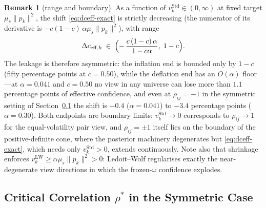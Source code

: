 \documentclass[a4paper,11pt]{article}
\theoremstyle{plain}
\theoremstyle{definition}
\newtheorem{remark}[proposition]{Remark}
\newcommand{\Std}{\mathrm{Std}}
\newcommand{\LW}{\mathrm{LW}}
\newcommand{\eff}{\mathrm{eff}}
\begin{document}
\begin{remark}[range and boundary]\label{rem:range}
As a function of $v_k^\Std \in (0,\infty)$ at fixed target
$\mu_s\lVert p_k\rVert^2$, the shift \eqref{eq:dceff-exact} is strictly
decreasing (the numerator of its derivative is
$-c(1-c)\,\alpha\mu_s\lVert p_k\rVert^2$), with range
\[
  \Delta c_{\eff,k} \;\in\;
  \Bigl(-\,\frac{c\,(1-c)\,\alpha}{1-c\alpha},\; 1-c\Bigr).
\]
The leakage is therefore asymmetric: the inflation end is bounded only
by $1-c$ (fifty percentage points at $c = 0.50$), while the deflation
end has an $O(\alpha)$ floor---at $\alpha = 0.041$ and $c = 0.50$ no
view in any universe can lose more than $1.1$ percentage points of
effective confidence, and even at $\rho_{ij} = -1$ in the symmetric
setting of Section~\ref{sec:rho-star} the shift is $-0.4$
($\alpha = 0.041$) to $-3.4$ percentage points ($\alpha = 0.30$). Both
endpoints are boundary limits: $v_k^\Std \to 0$ corresponds to
$\rho_{ij} \to 1$ for the equal-volatility pair view, and
$\rho_{ij} = \pm 1$ itself lies on the boundary of the
positive-definite cone, where the posterior machinery degenerates but
\eqref{eq:dceff-exact}, which needs only $v_k^\Std > 0$, extends
continuously. Note also that shrinkage enforces
$v_k^{\LW} \geq \alpha\mu_s\lVert p_k\rVert^2 > 0$: Ledoit--Wolf
regularises exactly the near-degenerate view directions in which the
frozen-$\omega$ confidence explodes.
\end{remark}

\subsection{Critical Correlation $\rho^*$ in the Symmetric Case}
\label{sec:rho-star}
\end{document}

